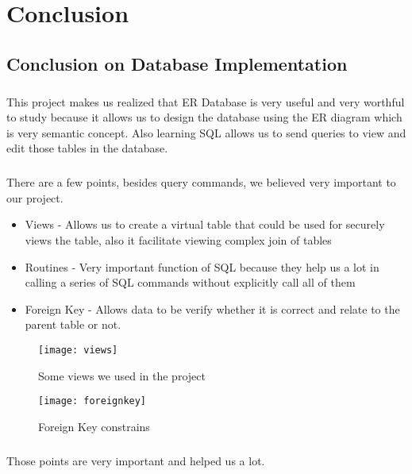
  \chapter{Conclusion}
    \section{Conclusion on Database Implementation}
      \paragraph{}
        This project makes us realized that ER Database is very useful and very worthful to study because it allows us to
        design the database using the ER diagram which is very semantic concept. Also learning SQL allows us to send queries to
        view and edit those tables in the database.
      \paragraph{}
        There are a few points, besides query commands, we believed very important to our project.
      \begin{itemize}
        \item Views - Allows us to create a virtual table that could be used for securely views the table, also it facilitate viewing complex join of tables
        \item Routines - Very important function of SQL because they help us a lot in calling a series of SQL commands without explicitly call all of them
        \item Foreign Key - Allows data to be verify whether it is correct and relate to the parent table or not.
      \end{itemize}
      \begin{center}
        \begin{figure}[!h]
          \texttt{[image: views]}
          \caption{Some views we used in the project}
        \end{figure}

        \begin{figure}[!h]
          \texttt{[image: foreignkey]}
          \caption{Foreign Key constrains}
        \end{figure}
      \end{center}
      \paragraph{}
        Those points are very important and helped us a lot.

